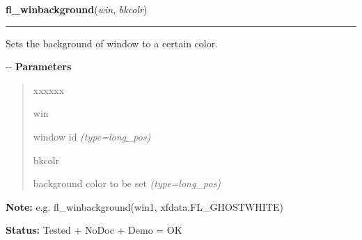 \hspace{.8\funcindent}\begin{boxedminipage}{\funcwidth}

    \raggedright \textbf{fl\_winbackground}(\textit{win}, \textit{bkcolr})

    \vspace{-1.5ex}

    \rule{\textwidth}{0.5\fboxrule}
\setlength{\parskip}{2ex}

Sets the background of window to a certain color.

-{}-
\setlength{\parskip}{1ex}
      \textbf{Parameters}
      \vspace{-1ex}

      \begin{quote}
        \begin{Ventry}{xxxxxx}

          \item[win]


window id
            {\it (type=long\_pos)}

          \item[bkcolr]


background color to be set
            {\it (type=long\_pos)}

        \end{Ventry}

      \end{quote}

\textbf{Note:} 
e.g. fl\_winbackground(win1, xfdata.FL\_GHOSTWHITE)


\textbf{Status:} 
Tested + NoDoc + Demo = OK


    \end{boxedminipage}

    \label{xformslib:flxbasic:fl_winbackground}

    \vspace{0.5ex}

